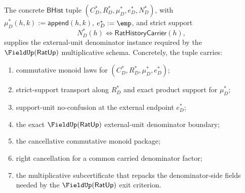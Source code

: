 \begin{theorem}
\label{thm:field-rat-denominator-external-unit-concrete-instance-unlock}
The concrete $\mathsf{BHist}$ tuple
$(C_D^\ast,R_D^\ast,\mu_D^\ast,e_D^\ast,N_D^\ast)$, with
$\mu_D^\ast(h,k):=\mathsf{append}(h,k)$, $e_D^\ast:=\emp$, and strict support
$$
N_D^\ast(h)\Longleftrightarrow\mathsf{RatHistoryCarrier}(h),
$$
supplies the external-unit denominator instance required by the
$\FieldUp(\mathsf{RatUp})$ multiplicative schema. Concretely, the tuple carries:
\begin{enumerate}
\item commutative monoid laws for
$(C_D^\ast,R_D^\ast,\mu_D^\ast,e_D^\ast)$;

\item strict-support transport along $R_D^\ast$ and exact product support for
$\mu_D^\ast$;

\item support-unit no-confusion at the external endpoint $e_D^\ast$;

\item the exact $\FieldUp(\mathsf{RatUp})$ external-unit denominator boundary;

\item the cancellative commutative monoid package;

\item right cancellation for a common carried denominator factor;

\item the multiplicative subcertificate that repacks the denominator-side fields
needed by the $\FieldUp(\mathsf{RatUp})$ exit criterion.
\end{enumerate}
\end{theorem}
